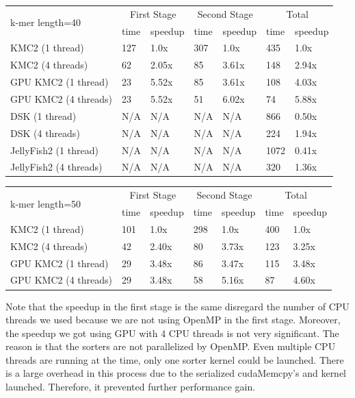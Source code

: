 \documentclass{bioinfo}
\begin{document}
\begin{table}[H]
{\begin{tabular}{|l|l|l|l|l|l|l|}
\hline
    \multirow{2}{*}{k-mer length=40} &
      \multicolumn{2}{c}{First Stage} &
      \multicolumn{2}{c}{Second Stage} &
      \multicolumn{2}{c|}{Total} \\
    & time & speedup & time & speedup & time & speedup \\
    \hline
    KMC2 (1 thread) & 127 & 1.0x & 307 & 1.0x & 435 & 1.0x  \\
    \hline
    KMC2 (4 threads) & 62 & 2.05x & 85 & 3.61x & 148 & 2.94x \\
    \hline
    GPU KMC2 (1 thread) & 23 & 5.52x & 85 & 3.61x & 108 & 4.03x \\
    \hline
    GPU KMC2 (4 threads) & 23 & 5.52x & 51 & 6.02x & 74 & 5.88x \\
    \hline
    DSK (1 thread) & N/A & N/A & N/A & N/A & 866 & 0.50x\\
    \hline
    DSK (4 threads) & N/A & N/A & N/A & N/A & 224 & 1.94x\\
    \hline
    JellyFish2 (1 thread) & N/A & N/A & N/A & N/A & 1072 & 0.41x\\
    \hline
    JellyFish2 (4 threads) & N/A & N/A & N/A & N/A & 320 & 1.36x\\
    \hline
\end{tabular}}{}
{\begin{tabular}{|l|l|l|l|l|l|l|}
\hline
    \multirow{2}{*}{k-mer length=50} &
      \multicolumn{2}{c}{First Stage} &
      \multicolumn{2}{c}{Second Stage} &
      \multicolumn{2}{c|}{Total} \\
    & time & speedup & time & speedup & time & speedup \\
    \hline
    KMC2 (1 thread) & 101 & 1.0x & 298 & 1.0x & 400 & 1.0x  \\
    \hline
    KMC2 (4 threads) & 42 & 2.40x & 80 & 3.73x & 123 & 3.25x \\
    \hline
    GPU KMC2 (1 thread) & 29 & 3.48x & 86 & 3.47x & 115 & 3.48x \\
    \hline
    GPU KMC2 (4 threads) & 29 & 3.48x & 58 & 5.16x & 87 & 4.60x \\
    \hline
\end{tabular}}{}
\end{table}

Note that the speedup in the first stage is the same disregard the number of CPU
threads we used because we are not using OpenMP in the first stage.
Moreover, the speedup we got using GPU with 4 CPU threads is not very significant.
The reason is that the sorters are not parallelized by OpenMP. Even multiple CPU threads
are running at the time, only one sorter kernel could be launched.
There is a large overhead in this process due to the serialized cudaMemcpy's and kernel
launched. Therefore, it prevented further performance gain.
\end{document}
